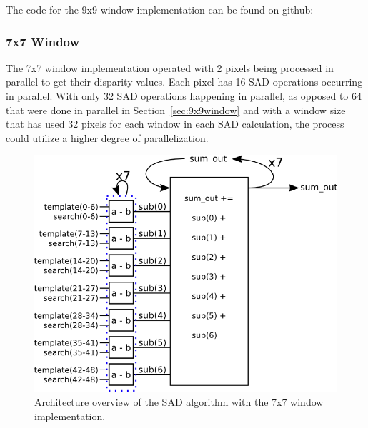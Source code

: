 The code for the 9x9 window implementation can be found on github:
\\

\subsubsection{7x7 Window}

The 7x7 window implementation operated with 2 pixels being processed in parallel to get their disparity values. Each pixel has 16 SAD operations occurring in parallel. With only 32 SAD operations happening in parallel, as opposed to 64 that were done in parallel in Section~\ref{sec:9x9window} and with a window size that has used 32 pixels for each window in each SAD calculation, the process could utilize a higher degree of parallelization.

\begin{figure}[h]
	\begin{center}
		\includegraphics[width=120mm]{figures/sadAlgorithm7x7.png}
		\captionfonts
		\caption{Architecture overview of the SAD algorithm with the 7x7 window implementation.}
		\label{fig:sadAlg7x7}
	\end{center}
\end{figure}


